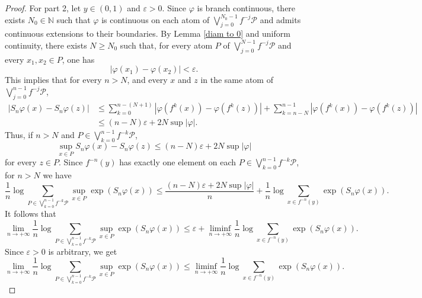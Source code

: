 \documentclass[12pt]{amsart}
\numberwithin{equation}{section} %
\numberwithin{figure}{section} %
\theoremstyle{plain}
\theoremstyle{definition}
\theoremstyle{remark}
\theoremstyle{citing}
\renewcommand{\=}{\coloneqq}
\begin{document}
\begin{proof}
For part 2, let $y\in(0,1)$ and $\varepsilon>0$. Since $\varphi$ is branch continuous, there exists $N_0 \in \mathbb{N}$ such that $\varphi$ is continuous on each atom of $\bigvee_{j=0}^{N_0-1} f^{-j}\mathcal{P}$ and admits continuous extensions to their boundaries. By Lemma \ref{diam to 0}  and uniform continuity, there exists $N\geq N_0$ such that, for every atom $P$ of $\bigvee_{j=0}^{N-1} f^{-j}\mathcal{P}$ and every $x_1,x_2\in P$, one has
\begin{equation*}
   |\varphi(x_1) - \varphi(x_2)|<\varepsilon. 
\end{equation*}
This implies that for every $n> N$, and every $x$ and $z$ in the same atom of $\bigvee_{j=0}^{n-1} f^{-j}\mathcal{P}$, 
\begin{equation*}
\begin{split}
    |S_n\varphi(x) - S_n\varphi(z)| &\leq \sum_{k=0}^{n-(N+1)} |\varphi(f^k(x)) - \varphi(f^k(z))| + \sum_{k=n-N}^{n-1} |\varphi(f^k(x)) - \varphi(f^k(z))|\\
    &\leq (n-N)\varepsilon + 2N\sup|\varphi|. 
    \end{split}
\end{equation*}
Thus, if $n> N$ and $P \in \bigvee_{k=0}^{n-1} f^{-k}\mathcal{P}$,
\begin{equation*}
    \sup_{x\in P}S_n\varphi(x) - S_n\varphi(z) \leq (n-N)\varepsilon + 2N\sup|\varphi|
\end{equation*}
for every $z\in P$. Since $f^{-n}(y)$ has exactly one element on each $P\in \bigvee_{k=0}^{n-1} f^{-k}\mathcal{P}$, for $n>N$ we have
\begin{equation*}
    \frac{1}{n} \log \sum_{P\in \bigvee_{k=0}^{n-1}f^{-k} \mathcal{P}} \sup_{x\in P}\exp(S_n\varphi(x)) \leq \frac{(n-N)\varepsilon + 2N\sup|\varphi|}{n} + \frac{1}{n} \log \sum_{x\in f^{-n}(y)}\exp(S_n\varphi(x)).
\end{equation*}
It follows that 
\begin{equation*}
    \lim_{n\to+\infty}  \frac{1}{n}\log \sum_{P\in \bigvee_{k=0}^{n-1}f^{-k} \mathcal{P}} \sup_{x\in P}\exp(S_n\varphi(x)) \leq \varepsilon + \liminf_{n\to+\infty} \frac{1}{n} \log \sum_{x\in f^{-n}(y)} \exp(S_n \varphi(x)).
\end{equation*}
Since $\varepsilon>0$ is arbitrary, we get
\begin{equation}\label{equation tree pressure lower bound}
     \lim_{n\to+\infty}  \frac{1}{n}\log \sum_{P\in \bigvee_{k=0}^{n-1}f^{-k} \mathcal{P}} \sup_{x\in P}\exp(S_n\varphi(x)) \leq \liminf_{n\to+\infty} \frac{1}{n} \log \sum_{x\in f^{-n}(y)} \exp(S_n \varphi(x)).

\end{equation}
\end{proof}
\end{document}
